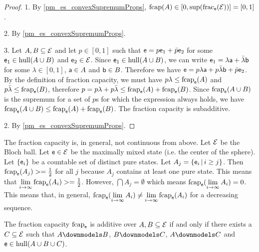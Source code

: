 \begin{mathSection}
	\begin{proof}
		1. By \ref{pm_es_convexSupremumProps}, $\fcap(A) \in [0, \sup(\fraction_{\ens}(\Ens))] = [0,1]$. 
	
		2. By \ref{pm_es_convexSupremumProps}.
		
		3. Let $A, B \subseteq \Ens$ and let $p \in [0,1]$ such that $\ens = p \ens_1 + \bar{p} \ens_2$ for some $\ens_1 \in \hull(A \cup B)$ and $\ens_2 \in \Ens$. Since $\ens_1 \in \hull(A \cup B)$, we can write $\ens_1 = \lambda \ens[a] + \bar{\lambda} \ens[b]$ for some $\lambda \in [0,1]$, $\ens[a] \in A$ and $\ens[b] \in B$. Therefore we have $\ens = p \lambda \ens[a] + p \bar{\lambda} \ens[b] + \bar{p} \ens_2$. By the definition of fraction capacity, we must have $p\lambda \leq \fcap_{\ens}(A)$ and $p\bar{\lambda} \leq \fcap_{\ens}(B)$, therefore $p = p\lambda + p\bar{\lambda} \leq \fcap_{\ens}(A) + \fcap_{\ens}(B)$. 	Since $\fcap_{\ens}(A \cup B)$ is the supremum for a set of $p$s for which the expression always holds, we have $\fcap_{\ens}(A \cup B) \leq \fcap_{\ens}(A) + \fcap_{\ens}(B)$. The fraction capacity is subadditive.
	
		2. By \ref{pm_es_convexSupremumProps}.
	\end{proof}
	

\begin{remark}
	The fraction capacity is, in general, not continuous from above. Let $\Ens$ be the Bloch ball. Let $\ens \in \Ens$ be the maximally mixed state (i.e. the center of the sphere). Let $\{\ens_i\}$ be a countable set of distinct pure states. Let $A_j = \{ \ens_i \, | \, i \geq j\}$. Then $\fcap_{\ens}(A_j) >= \frac{1}{2}$ for all $j$ because $A_j$ contains at least one pure state. This means that $\lim\limits_{i \to \infty} \fcap_{\ens}(A_i) >= \frac{1}{2}$. However, $\bigcap A_j = \emptyset$ which means $\fcap_{\ens}(\lim\limits_{i \to \infty} A_i) = 0$. This means that, in general, $\fcap_{\ens}(\lim\limits_{i \to \infty} A_i) \neq \lim\limits_{i \to \infty} \fcap_{\ens}(A_i)$ for a decreasing sequence.
\end{remark}
	
\end{mathSection}

\begin{conj}
	The fraction capacity $\fcap_{\ens}$ is additive over $A, B \subseteq \Ens$ if and only if there exists a $C \subseteq \Ens$ such that $A \separate B$, $B \separate C$, $A \separate C$ and $\ens \in \hull(A\cup B\cup C)$.
\end{conj}

